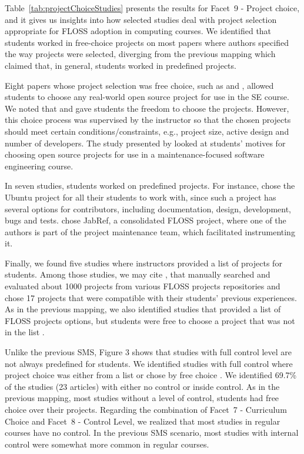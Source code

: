 

Table~\ref{tab:projectChoiceStudies} presents the results
for Facet~9 - Project choice, and it
gives us insights into how selected studies deal with project selection appropriate for FLOSS adoption in computing courses.
We identified that students worked in free-choice projects on most papers where authors specified the way projects were selected, 
diverging from the previous mapping which claimed that, 
in general, students worked in predefined projects. 

Eight papers whose project selection was free choice, such as \citeauthor{id17882} and \citeauthor{id5343}, allowed students to choose any real-world open source project for use in the SE course. We noted that \citeauthor{id17796} and \citeauthor{id0098} gave students the freedom to choose the projects. 
However, this choice process was supervised by the instructor so that the chosen projects should meet certain conditions/constraints, e.g.,  project size, active design and number of developers. The study presented by \citeauthor{id5357} looked at students' motives for choosing open source projects for use in a maintenance-focused software engineering course. 

In seven studies, students worked on predefined projects. For instance, \citeauthor{id5329} chose the Ubuntu project for all their students to work with, since such a project has several options for contributors, including documentation, design, development, bugs and tests. \citeauthor{id1192} chose JabRef, a consolidated FLOSS project, where one of the authors is part of the project maintenance team, which facilitated instrumenting it. 

Finally, we found five studies where instructors provided a list of projects for students. Among those studies, we may cite \citeauthor{id0135}, that manually searched and evaluated about 1000 projects from various FLOSS projects repositories and chose 17 projects that were compatible with their students' previous experiences. 
As in the previous mapping, we also identified studies that provided a list of FLOSS projects options, but students were free to choose a project that was not in the list \cite{id5546}.



Unlike the previous SMS, 
Figure 3 shows that studies with full control level are not always predefined for students. 
We identified studies with full control where project choice was either from a list \cite{id0135} or chose by free choice \cite{id1088}. 
We identified 69.7\% of the studies (23 articles) with either no control or inside control. As in the previous mapping, most studies without a level of control, students had free choice over their projects. 
Regarding the combination of Facet~7 - Curriculum Choice and 
Facet~8 - Control Level, we realized that most studies in regular courses have no control. 
In the previous SMS scenario, 
most studies with internal control were somewhat more common in regular courses.

